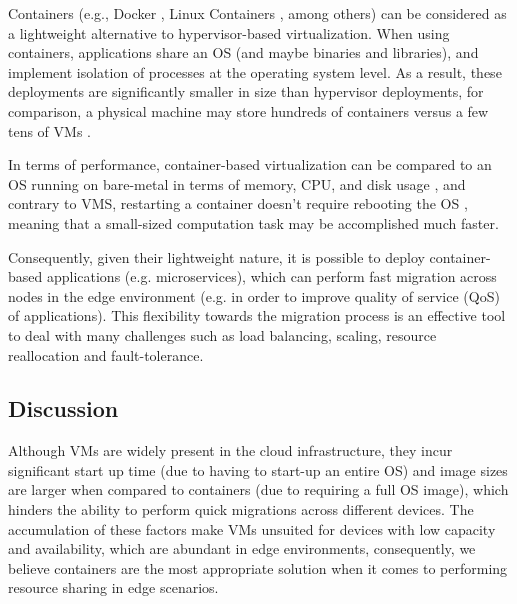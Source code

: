 Containers (e.g., Docker \cite{docker}, Linux Containers \cite{lxc}, among others) can be considered as a lightweight alternative to hypervisor-based virtualization. When using containers, applications share an OS (and maybe binaries and libraries), and implement isolation of processes at the operating system level. As a result, these deployments are significantly smaller in size than hypervisor deployments, for comparison, a physical machine may store hundreds of containers versus a few tens of VMs \cite{7036275}.  

In terms of performance, container-based virtualization can be compared to an OS running on bare-metal in terms of memory, CPU, and disk usage \cite{preeth2015evaluation}, and contrary to VMS, restarting a container doesn't require rebooting the OS \cite{7036275}, meaning that a small-sized computation task may be accomplished much faster. 

Consequently, given their lightweight nature, it is possible to deploy container-based applications (e.g. microservices), which can perform fast migration across nodes in the edge environment (e.g. in order to improve quality of service (QoS) of applications). This flexibility towards the migration process is an effective tool to deal with many challenges such as load balancing, scaling, resource reallocation and fault-tolerance. 

\subsection{Discussion}

Although VMs are widely present in the cloud infrastructure, they incur significant start up time (due to having to start-up an entire OS) and image sizes are larger when compared to containers (due to requiring a full OS image), which hinders the ability to perform quick migrations across different devices. The accumulation of these factors make VMs unsuited for devices with low capacity and availability, which are abundant in edge environments, consequently, we believe containers are the most appropriate solution when it comes to performing resource sharing in edge scenarios. 